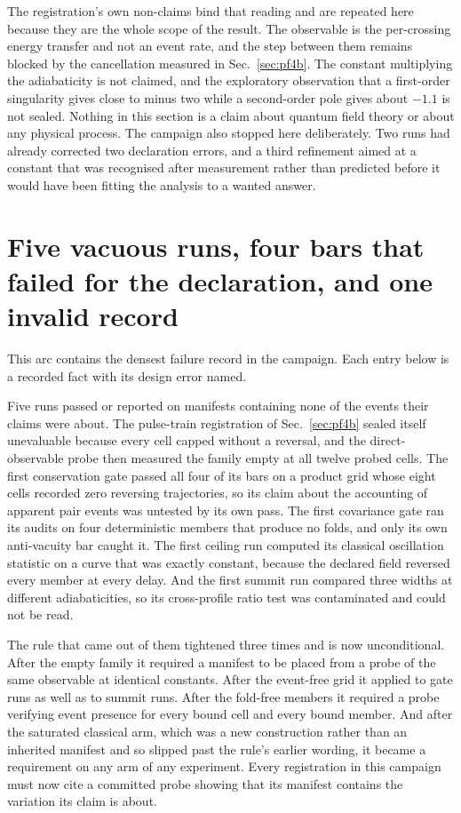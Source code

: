 \documentclass[aps,pre,reprint,nofootinbib,floatfix]{revtex4-2}
\begin{document}
The registration's own non-claims bind that reading and are repeated
here because they are the whole scope of the result.  The observable is
the per-crossing energy transfer and not an event rate, and the step
between them remains blocked by the cancellation measured in
Sec.~\ref{sec:pf4b}.  The constant multiplying the adiabaticity is not
claimed, and the exploratory observation that a first-order singularity
gives close to minus two while a second-order pole gives about
$-1.1$ is not sealed.  Nothing in this section is a claim about quantum
field theory or about any physical process.  The campaign also stopped
here deliberately.  Two runs had already corrected two declaration
errors, and a third refinement aimed at a constant that was recognised
after measurement rather than predicted before it would have been
fitting the analysis to a wanted answer.

\section{Five vacuous runs, four bars that failed for the declaration,
and one invalid record}
\label{sec:spine}

This arc contains the densest failure record in the campaign.  Each
entry below is a recorded fact with its design error named.

Five runs passed or reported on manifests containing none of the events
their claims were about.  The pulse-train registration of
Sec.~\ref{sec:pf4b} sealed itself unevaluable because every cell capped
without a reversal, and the direct-observable probe then measured the
family empty at all twelve probed cells.  The first conservation gate
passed all four of its bars on a product grid whose eight cells
recorded zero reversing trajectories, so its claim about the accounting
of apparent pair events was untested by its own pass.  The first
covariance gate ran its audits on four deterministic members that
produce no folds, and only its own anti-vacuity bar caught it.  The
first ceiling run computed its classical oscillation statistic on a
curve that was exactly constant, because the declared field reversed
every member at every delay.  And the first summit run compared three
widths at different adiabaticities, so its cross-profile ratio test was
contaminated and could not be read.

The rule that came out of them tightened three times and is now
unconditional.  After the empty family it required a manifest to be
placed from a probe of the same observable at identical constants.
After the event-free grid it applied to gate runs as well as to summit
runs.  After the fold-free members it required a probe verifying event
presence for every bound cell and every bound member.  And after the
saturated classical arm, which was a new construction rather than an
inherited manifest and so slipped past the rule's earlier wording, it
became a requirement on any arm of any experiment.  Every registration
in this campaign must now cite a committed probe showing that its
manifest contains the variation its claim is about.
\end{document}

